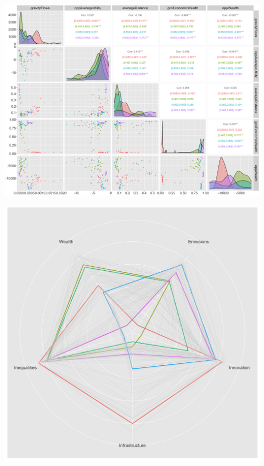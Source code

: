 \documentclass[a0paper]{tikzposter}
\begin{document}
{\begin{minipage}{0.55\textwidth}
            \end{minipage}\hfill
            \begin{minipage}{0.2\textwidth}
                \includegraphics[width=\linewidth]{figures/scatter_models_colorginiEconomicWealth_OPTIMISATION_GRID_20220622_092133.png}
            \end{minipage}\hfill
            \begin{minipage}{0.15\textwidth}
                \includegraphics[width=\linewidth]{figures/radar_sdgs.png}
            \end{minipage}

   
		}
\end{document}
